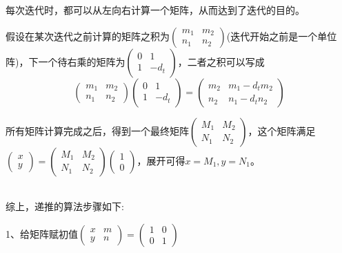 \documentclass[UTF8,a4paper,10.5pt,twocolumn]{ctexart}
\begin{document}
	\par 每次迭代时，都可以从左向右计算一个矩阵，从而达到了迭代的目的。
	\par 假设在某次迭代之前计算的矩阵之积为$\left(\begin{matrix}m_{1} & m_{2}\\n_{1} & n_{2}\end{matrix}\right)$(迭代开始之前是一个单位阵)，下一个待右乘的矩阵为$\left(\begin{matrix}0 & 1\\1 & -d_{t}\end{matrix}\right)$，二者之积可以写成\\
	$$
		\left(\begin{matrix}m_{1} & m_{2}\\n_{1} & n_{2}\end{matrix}\right)
		\left(\begin{matrix}0 & 1\\1 & -d_{t}\end{matrix}\right)
		=
		\left(\begin{matrix}m_{2} & m_{1}-d_{t}m_{2}\\n_{2} & n_{1}-d_{t}n_{2}\end{matrix}\right)
	$$
	\par 所有矩阵计算完成之后，得到一个最终矩阵$\left(\begin{matrix}M_{1} & M_{2}\\N_{1} & N_{2}\end{matrix}\right)$，这个矩阵满足$\left(\begin{matrix}x\\ y \end{matrix}\right) =\left(\begin{matrix}M_{1} & M_{2}\\N_{1} & N_{2}\end{matrix}\right) \left(\begin{matrix} 1 \\0\end{matrix}\right)$，展开可得$x=M_{1},y=N_{1}$。\\ \\
	
	\par 综上，递推的算法步骤如下:
	\par 1、给矩阵赋初值$\left(\begin{matrix}x & m\\y & n\end{matrix}\right) =\left(\begin{matrix}1 & 0\\0 & 1\end{matrix}\right) $ 
\end{document}
